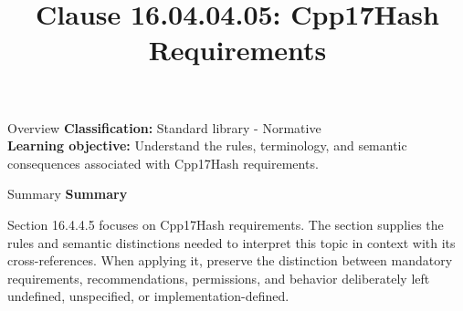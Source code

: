 \documentclass[10pt,letterpaper]{article}
\title{Clause 16.04.04.05: Cpp17Hash Requirements}
\author{}
\date{}
\begin{document}
\maketitle
\begin{CornellOverviewBox}{Overview}
\textbf{Classification:} Standard library - Normative\\[2pt]
\textbf{Learning objective:} Understand the rules, terminology, and semantic consequences associated with Cpp17Hash requirements.
\end{CornellOverviewBox}\begin{CornellSummaryBox}{Summary}
{\sffamily\bfseries\color{Accent} Summary}\par\vspace{3pt}Section 16.4.4.5 focuses on Cpp17Hash requirements. The section supplies the rules and semantic distinctions needed to interpret this topic in context with its cross-references. When applying it, preserve the distinction between mandatory requirements, recommendations, permissions, and behavior deliberately left undefined, unspecified, or implementation-defined.
\end{CornellSummaryBox}
\end{document}
